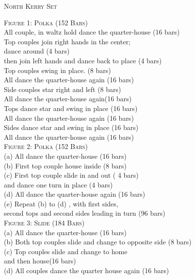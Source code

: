 \begin{center}
\textsc{North Kerry Set} \\
\end{center}


\small \textsc{Figure 1: Polka (152 Bars)}\\


\bodyText
All couple, in waltz hold dance the quarter-house \hfill(16 bars)\\
Top couples join right hands in the center; \\
dance around \hfill(4 bars)\\
then join left hands and dance back to place \hfill(4 bars) \\
Top couples swing in place. \hfill (8 bars)\\
All dance the quarter-house again \hfill(16 bars) \\
Side couples star right and left  \hfill(8 bars) \\
All dance the quarter-house again\hfill (16 bars) \\
Tops dance star and swing in place  \hfill(16 bars) \\
All dance the quarter-house again \hfill(16 bars) \\
Sides dance star and swing in place \hfill (16 bars) \\
All dance the quarter-house again \hfill(16 bars) \\

\small \textsc{Figure 2: Polka (152 Bars)}\\

\bodyText
(a) All dance the quarter-house \hfill(16 bars) \\
(b) First top couple house inside \hfill(8 bars) \\
(c) First top couple slide in and out ( 4 bars) \\
 and dance one turn in place \hfill(4 bars)\\
(d) All dance the quarter-house again (16 bars) \\
(e) Repeat (b) to (d) , with  first sides, \\
 second tops  and second sides leading in turn (96 bars)\\

\small \textsc{Figure 3: Slide (184 Bars)}\\

\bodyText
(a) All dance the quarter-house \hfill(16 bars) \\
(b) Both top couples slide and change to opposite side (8 bars)\\
(c) Top couples slide and change to home \\
 and then house\hfill (16 bars) \\
(d) All couples dance the quarter house again \hfill(16 bars)\\
